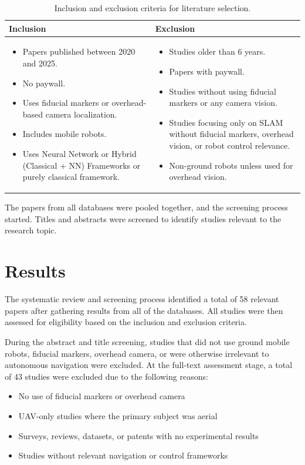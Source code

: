 \begin{table}[ht]
\centering
\begin{tabular}{p{7cm} p{7cm}}
\hline
\textbf{Inclusion} & \textbf{Exclusion} \\
\hline
\begin{itemize}
  \item Papers published between 2020 and 2025.
  \item No paywall.
  \item Uses fiducial markers or overhead-based camera localization.
  \item Includes mobile robots.
  \item Uses Neural Network or Hybrid (Classical + NN) Frameworks or purely classical framework.
\end{itemize} &
\begin{itemize}
  \item Studies older than 6 years.
  \item Papers with paywall.
  \item Studies without using fiducial markers or any camera vision.
  \item Studies focusing only on SLAM without fiducial markers, overhead vision, or robot control relevance.
  \item Non-ground robots unless used for overhead vision.
\end{itemize} \\
\hline
\end{tabular}
\caption{Inclusion and exclusion criteria for literature selection.}
\label{tab:inclusion_exclusion}
\end{table}

The papers from all databases were  pooled together, and the screening process started. Titles and abstracts were screened to identify studies relevant to the research topic.

\section{Results}
The systematic review and screening process identified a total of 58 relevant papers after gathering results from all of the databases. All studies were then assessed for eligibility based on the inclusion and exclusion criteria.

During the abstract and title screening, studies that did not use ground mobile robots, fiducial markers, overhead camera, or were otherwise irrelevant to autonomous navigation were excluded. At the full-text assessment stage, a total of 43 studies were excluded due to the following reasons:
\begin{itemize}
    \item No use of fiducial markers or overhead camera
    \item UAV-only studies where the primary subject was aerial
    \item Surveys, reviews, datasets, or patents with no experimental results
    \item Studies without relevant navigation or control frameworks
\end{itemize}

